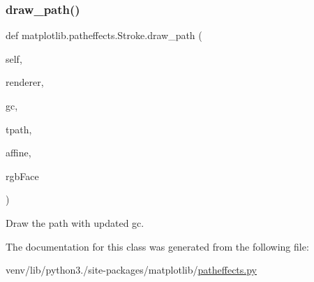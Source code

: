 \subsubsection{\texorpdfstring{draw\+\_\+path()}{draw\_path()}}
{\footnotesize\ttfamily def matplotlib.\+patheffects.\+Stroke.\+draw\+\_\+path (\begin{DoxyParamCaption}\item[{}]{self,  }\item[{}]{renderer,  }\item[{}]{gc,  }\item[{}]{tpath,  }\item[{}]{affine,  }\item[{}]{rgb\+Face }\end{DoxyParamCaption})}

\begin{DoxyVerb}Draw the path with updated gc.\end{DoxyVerb}
 

The documentation for this class was generated from the following file\+:\begin{DoxyCompactItemize}
\item 
venv/lib/python3./site-\/packages/matplotlib/\hyperlink{patheffects_8py}{patheffects.\+py}\end{DoxyCompactItemize}
